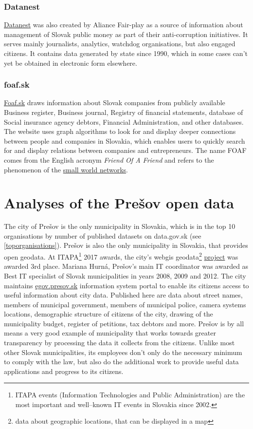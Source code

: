 \documentclass[thesis=B,english]{FITthesis}[2012/06/26]
\begin{document}
	\subsection{Datanest}
	\href{http://datanest.fair-play.sk/}{Datanest} was also created by Aliance Fair-play as a source of information about management of Slovak public money as part of their anti-corruption initiatives. It serves mainly journalists, analytics, watchdog organisations, but also engaged citizens. It contains data generated by state since 1990, which in some cases can't yet be obtained in electronic form elsewhere.
	\subsection{foaf.sk}
	\href{http://foaf.sk}{Foaf.sk} draws information about Slovak companies from publicly available Business register, Business journal, Registry of financial statements, database of Social insurance agency debtors, Financial Administration, and other databases. The website uses graph algorithms to look for and display deeper connections between people and companies in Slovakia, which enables users to quickly search for and display relations between companies and entrepreneurs. The name FOAF comes from the English acronym \textit{Friend Of A Friend} and refers to the phenomenon of the \href{http://www.scholarpedia.org/article/Small-world_network}{small world networks}.

	
\chapter{Analyses of the Prešov open data}
\label{presovopendata}
	The city of Prešov is the only municipality in Slovakia, which is in the top 10 organisations by number of published datasets on data.gov.sk (see \ref{toporganisations}). Prešov is also the only municipality in Slovakia, that provides open geodata. At ITAPA\footnote{ITAPA events (Information Technologies and Public Administration) are the most important and well–known IT events in Slovakia since 2002.\cite{itapa}} 2017 awards, the city's webgis geodata\footnote{data about geographic locations, that can be displayed in a map} \href{http://webgis.presov.sk/}{project} was awarded 3rd place. Mariana Hurná, Prešov's main IT coordinator was awarded as Best IT specialist of Slovak municipalities in years 2008, 2009 and 2012. The city maintains \href{http://egov.presov.sk}{egov.presov.sk} information system  portal to enable its citizens access to useful information about city data. Published here are data about street names, members of municipal government, members of municipal police, camera systems locations, demographic structure of citizens of the city, drawing of the municipality budget, register of petitions, tax debtors and more. Prešov is by all means a very good example of municipality that works towards greater  transparency by processing the data it collects from the citizens. Unlike most other Slovak municipalities, its employees don't only do the necessary minimum to comply with the law, but also do the additional work to provide useful data applications and progress to its citizens.
	
\end{document}
